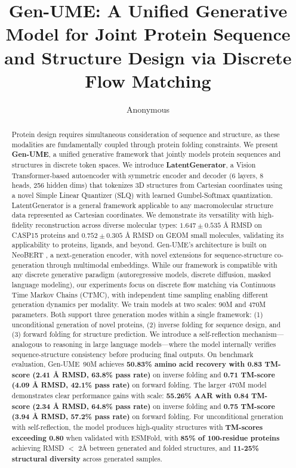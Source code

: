 \documentclass[11pt,a4paper]{article}
\title{\textbf{Gen-UME: A Unified Generative Model for Joint Protein Sequence and Structure Design via Discrete Flow Matching}}
\author{Anonymous}
\date{}
\newcommand{\genume}{Gen-UME}
\begin{document}
\maketitle

\begin{abstract}
Protein design requires simultaneous consideration of sequence and structure, as these modalities are fundamentally coupled through protein folding constraints. We present \textbf{\genume}, a unified generative framework that jointly models protein sequences and structures in discrete token spaces. We introduce \textbf{LatentGenerator}, a Vision Transformer-based autoencoder with symmetric encoder and decoder (6 layers, 8 heads, 256 hidden dims) that tokenizes 3D structures from Cartesian coordinates using a novel Simple Linear Quantizer (SLQ) with learned Gumbel-Softmax quantization. LatentGenerator is a general framework applicable to any macromolecular structure data represented as Cartesian coordinates. We demonstrate its versatility with high-fidelity reconstruction across diverse molecular types: $1.647 \pm 0.535$ Å RMSD on CASP15 proteins and $0.752 \pm 0.305$ Å RMSD on GEOM small molecules, validating its applicability to proteins, ligands, and beyond. \genume's architecture is built on NeoBERT \cite{lebreton2025}, a next-generation encoder, with novel extensions for sequence-structure co-generation through multimodal embeddings. While our framework is compatible with any discrete generative paradigm (autoregressive models, discrete diffusion, masked language modeling), our experiments focus on discrete flow matching via Continuous Time Markov Chains (CTMC), with independent time sampling enabling different generation dynamics per modality. We train models at two scales: 90M and 470M parameters. Both support three generation modes within a single framework: (1) unconditional generation of novel proteins, (2) inverse folding for sequence design, and (3) forward folding for structure prediction. We introduce a self-reflection mechanism---analogous to reasoning in large language models---where the model internally verifies sequence-structure consistency before producing final outputs. On benchmark evaluation, \genume~90M achieves \textbf{50.83\% amino acid recovery with 0.83 TM-score (2.41 Å RMSD, 63.8\% pass rate)} on inverse folding and \textbf{0.71 TM-score (4.09 Å RMSD, 42.1\% pass rate)} on forward folding. The larger 470M model demonstrates clear performance gains with scale: \textbf{55.26\% AAR with 0.84 TM-score (2.34 Å RMSD, 64.8\% pass rate)} on inverse folding and \textbf{0.75 TM-score (3.94 Å RMSD, 57.2\% pass rate)} on forward folding. For unconditional generation with self-reflection, the model produces high-quality structures with \textbf{TM-scores exceeding 0.80} when validated with ESMFold, with \textbf{85\% of 100-residue proteins} achieving RMSD $<$ 2Å between generated and folded structures, and \textbf{11-25\% structural diversity} across generated samples.
\end{abstract}
\end{document}
